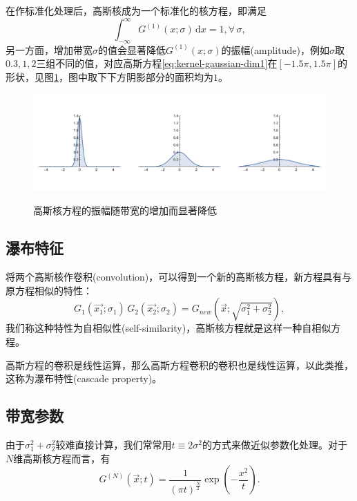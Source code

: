 \begin{subappendices}
在作标准化处理后，高斯核成为一个标准化的核方程，即满足
\begin{equation*}
  \int_{-\infty}^{\infty} G^{(1)} \left( x; \sigma \right)
  \, \mathrm{d} x = 1, \forall \, \sigma,
\end{equation*}
另一方面，增加带宽$\sigma$的值会显著降低$G^{(1)} \left( x ; \sigma \right)$的振幅(amplitude)，例如$\sigma$取$0.3,1,2$三组不同的值，对应高斯方程\eqref{eq:kernel-gaussian-dim1}在$[-1.5\pi, 1.5\pi]$的形状，见图\ref{fig:gaussian-amplitude-sigma}，图中取下下方阴影部分的面积均为$1$。
\begin{figure}[htbp]
  \caption{高斯核方程的振幅随带宽的增加而显著降低}
  \centering
  \includegraphics[width=12cm]{./Figures/20180404-gaussian-amplitude-sigma}
  \label{fig:gaussian-amplitude-sigma}
%
\end{figure}

\subsection{瀑布特征}
\label{sec:kernel-gaussian-cascade}
将两个高斯核作卷积(convolution)，可以得到一个新的高斯核方程，新方程具有与原方程相似的特性：
\begin{equation}
  \label{eq:kernel-gaussian-convolution}
  G_{1}\left( \vec{x_{1}}; \sigma_{1} \right)
  \, G_{2}\left( \vec{x_{2}}; \sigma_{2} \right)
  =  G_{new} \left( \vec{x} ; \sqrt{\sigma_{1}^{2} + \sigma_{2}^{2}} \right),
\end{equation}
我们称这种特性为自相似性(self-similarity)，高斯核方程就是这样一种自相似方程。

高斯方程的卷积是线性运算，那么高斯方程卷积的卷积也是线性运算，以此类推，这称为瀑布特性(cascade property)。

\subsection{带宽参数}
\label{sec:kernel-gaussian-bandwidth}
由于$\sigma_{1}^{2}+\sigma_{2}^{2}$较难直接计算，我们常常用$t \equiv 2 \sigma^{2}$的方式来做近似参数化处理。对于$N$维高斯核方程而言，有
\begin{equation*}
  G^{(N)} \left( \vec{x}; t\right) = \frac{1}{\left( \pi t \right)^{\frac{N}{2}}} \exp \left( - \frac{x^{2}}{t} \right).
\end{equation*}


\end{subappendices}
